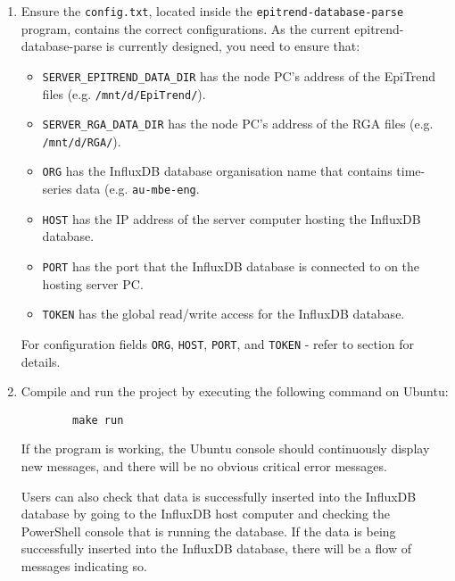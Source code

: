 \documentclass{article}
\begin{document}
\begin{enumerate}
    
    \item Ensure the \texttt{config.txt}, located inside the \texttt{epitrend-database-parse} program, contains the correct configurations. As the current epitrend-database-parse is currently designed, you need to ensure that:
    \begin{itemize}
        \item \texttt{SERVER\_EPITREND\_DATA\_DIR} has the node PC's address of the EpiTrend files (e.g. \texttt{/mnt/d/EpiTrend/}).
        \item \texttt{SERVER\_RGA\_DATA\_DIR} has the node PC's address of the RGA files (e.g. \texttt{/mnt/d/RGA/}).
        \item \texttt{ORG} has the InfluxDB database organisation name that contains time-series data (e.g. \texttt{au-mbe-eng}.
        
        \item \texttt{HOST} has the IP address of the server computer hosting the InfluxDB database.
        
        \item \texttt{PORT} has the port that the InfluxDB database is connected to on the hosting server PC.

        \item \texttt{TOKEN} has the global read/write access for the InfluxDB database.
    \end{itemize}

    \noindent
    For configuration fields \texttt{ORG}, \texttt{HOST}, \texttt{PORT}, and \texttt{TOKEN} - refer to section \textbf{} for details.

    \item Compile and run the project by executing the following command on Ubuntu:
    \begin{verbatim}
        make run
    \end{verbatim}
    \noindent
    If the program is working, the Ubuntu console should continuously display new messages, and there will be no obvious critical error messages. 
    
    Users can also check that data is successfully inserted into the InfluxDB database by going to the InfluxDB host computer and checking the PowerShell console that is running the database. If the data is being successfully inserted into the InfluxDB database, there will be a flow of messages indicating so.
    
\end{enumerate}
\end{document}
